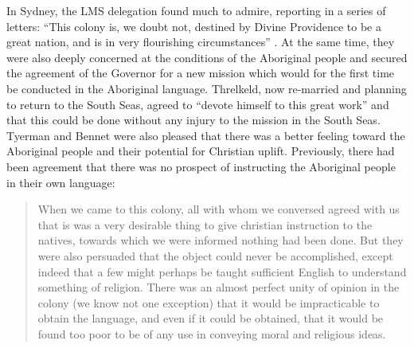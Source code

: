 In Sydney, the LMS delegation found much to admire, reporting in a series of letters: “This colony is, we doubt not, destined by Divine Providence to be a great nation, and is in very flourishing circumstances” \citep[290]{tyerman_extracts_1827}. At the same time, they were also deeply concerned at the conditions of the Aboriginal people and secured the agreement of the Governor for a new mission which would for the first time be conducted in the Aboriginal language. Threlkeld, now re-married and planning to return to the South Seas, agreed to “devote himself to this great work” and that this could be done without any injury to the mission in the South Seas. Tyerman and Bennet were also pleased that there was a better feeling toward the Aboriginal people and their potential for Christian uplift. Previously, there had been agreement that there was no prospect of instructing the Aboriginal people in their own language:

\begin{quote}
     When we came to this colony, all with whom we conversed agreed with us that is was a very desirable thing to give christian instruction to the natives, towards which we were informed nothing had been done. But they were also persuaded that the object could never be accomplished, except indeed that a few might perhaps be taught sufficient English to understand something of religion. There was an almost perfect unity of opinion in the colony (we know not one exception) that it would be impracticable to obtain the language, and even if it could be obtained, that it would be found too poor to be of any use in conveying moral and religious ideas. \citep[294]{tyerman_extracts_1827}
\end{quote}

